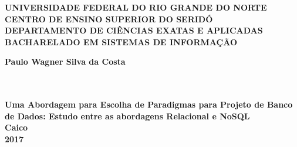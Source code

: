 \thispagestyle{empty}

\vfill
 \begin{center}
    

    {\large\bfseries UNIVERSIDADE FEDERAL DO RIO GRANDE DO NORTE} \\
    {\large\bfseries CENTRO DE ENSINO SUPERIOR DO SERIDÓ} \\
    {\large\bfseries DEPARTAMENTO DE CIÊNCIAS EXATAS E APLICADAS} \\
    {\large\bfseries BACHARELADO EM SISTEMAS DE INFORMAÇÃO} \\
    
   

    \vspace*{1in}
    \begin{large} \bfseries Paulo Wagner Silva da Costa  \end{large}\\[0.4in]

    \vspace*{4cm}
    \noindent \\
    
    \large\bfseries{Uma Abordagem para Escolha de Paradigmas para Projeto de Banco de Dados: Estudo entre as abordagens Relacional e NoSQL} \\
    \vfill
    \large\bfseries{ Caico \\ 2017}
    
\end{center}

\normalsize


